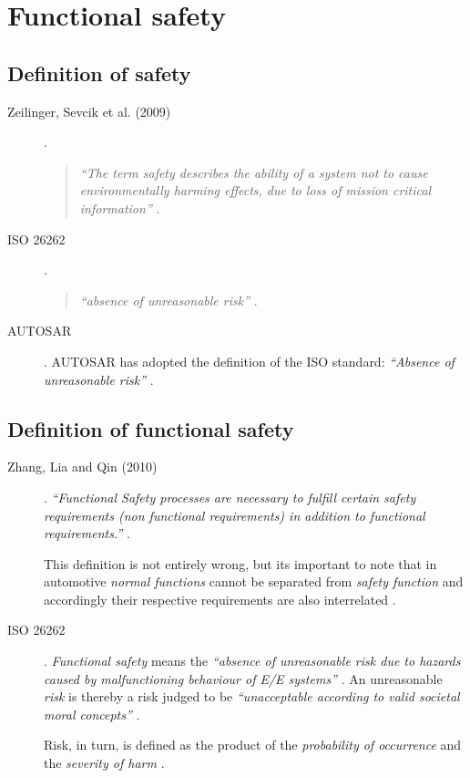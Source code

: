 \section{Functional safety}
\label{ch:functional_safety}


\subsection{Definition of safety}

\begin{description}
\item [Zeilinger, Sevcik et al. (2009)].
\begin{quote}
\emph{``The term safety describes the ability of a system not to cause environmentally harming effects, due to loss of mission critical information''} 
\cite[p.1]{zeilinger2009}.
\end{quote}

\item [ISO 26262]. 
\begin{quote}
\emph{``absence of unreasonable risk''} \cite{iso26262:1}.
\end{quote}

\item [AUTOSAR].
AUTOSAR has adopted the definition of the ISO standard:
\emph{``Absence of unreasonable risk''} \cite{autosar_glossary}.
\end{description}

\subsection{Definition of functional safety}

\begin{description}
\item [Zhang, Lia and Qin (2010)].
\emph{``Functional Safety processes are necessary to fulfill certain safety requirements (non functional requirements) in addition to functional requirements.''} \cite{zhang}.

This definition is not entirely wrong, but its important to note that in automotive \emph{normal functions} cannot be separated from \emph{safety function} and accordingly their respective requirements are also interrelated \cite{iso26262:course1}.

\item [ISO 26262].
\emph{Functional safety} means the \emph{``absence of unreasonable risk due to hazards caused by malfunctioning behaviour of E/E systems''} \cite{iso26262:1}. An unreasonable \emph{risk} is thereby a risk judged to be \emph{``unacceptable according to valid societal moral concepts''} \cite{iso26262:1}.

Risk, in turn, is defined as the product of the \emph{probability of occurrence} and the \emph{severity of harm} \cite{iso26262:1}.
\end{description}

